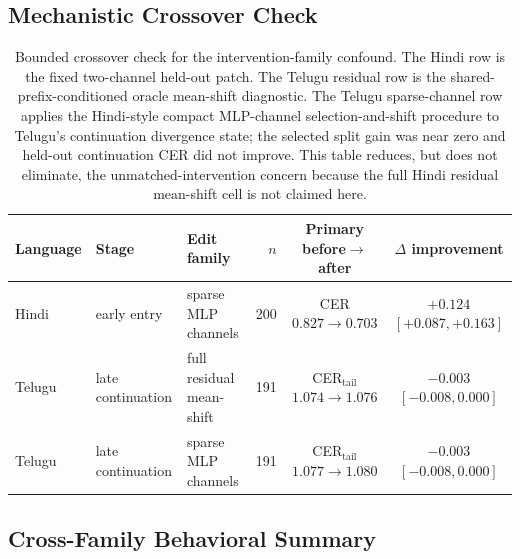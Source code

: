 \documentclass{article}
\begin{document}
\subsection{Mechanistic Crossover Check}\label{app:crossover}

\begin{table}[H]
\centering
\small
\setlength{\tabcolsep}{5pt}
\begin{tabular}{lllrcc}
\toprule
\textbf{Language} & \textbf{Stage} & \textbf{Edit family} & \textbf{$n$} & \textbf{Primary before$\to$after} & \textbf{$\Delta$ improvement} \\
\midrule
Hindi & early entry & sparse MLP channels & 200 & CER $0.827\to0.703$ & $+0.124$ $[+0.087,+0.163]$ \\
Telugu & late continuation & full residual mean-shift & 191 & CER$_{\mathrm{tail}}$ $1.074\to1.076$ & $-0.003$ $[-0.008,0.000]$ \\
Telugu & late continuation & sparse MLP channels & 191 & CER$_{\mathrm{tail}}$ $1.077\to1.080$ & $-0.003$ $[-0.008,0.000]$ \\
\bottomrule
\end{tabular}
\caption{Bounded crossover check for the intervention-family confound. The Hindi row is the fixed two-channel held-out patch. The Telugu residual row is the shared-prefix-conditioned oracle mean-shift diagnostic. The Telugu sparse-channel row applies the Hindi-style compact MLP-channel selection-and-shift procedure to Telugu's continuation divergence state; the selected split gain was near zero and held-out continuation CER did not improve. This table reduces, but does not eliminate, the unmatched-intervention concern because the full Hindi residual mean-shift cell is not claimed here.}
\label{tab:mechanistic_crossover}
\end{table}

\subsection{Cross-Family Behavioral Summary}\label{app:crossfamily}
\end{document}
